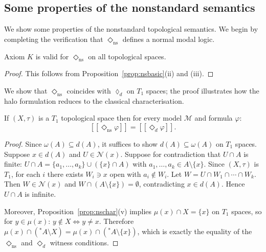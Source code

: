 \documentclass[submission,copyright,creativecommons]{eptcs}
\newcommand{\sem}[1]{[\![#1]\!]}
\newcommand{\diam}{\Diamond}
\newcommand{\sq}{\Box}
\newcommand{\str}{{{}^{*}\!}}
\newcommand{\lozengens}{\diam_\mathrm{ns}}
\begin{document}
\subsection{Some properties of the nonstandard semantics}
We show some properties of the nonstandard topological semantics.
We begin by completing the verification that $\lozengens$ defines a normal modal logic.
\begin{lemma}
\label{lem:nsK}
Axiom $K$ is valid for $\lozengens$ on all topological spaces.
\end{lemma}
\begin{proof}
This follows from Proposition~\ref{prop:nsbasic}(ii) and (iii).
\end{proof}

We show that $\lozengens$ coincides with $\lozenge_d$ on $T_1$ spaces; 
the proof illustrates how the halo formulation reduces to the classical characterisation.
\begin{lemma}
\label{thm:coincide}
If $(X,\tau)$ is a $T_1$ topological space then for every model $\mathcal{M}$
and formula $\varphi$:
\[
  \sem{\lozengens\varphi} = \sem{\diam_d\varphi}.
\]
\end{lemma}

\begin{proof}
Since $\omega(A) \subseteq d(A)$, it
suffices to show $d(A) \subseteq \omega(A)$ on
$T_1$ spaces.
Suppose $x \in d(A)$ and $U \in \mathcal{N}(x)$. Suppose for
contradiction that $U \cap A$ is finite: $U \cap A = \{a_1, \ldots, a_k\}
\cup (\{x\} \cap A)$ with $a_1, \ldots, a_k \in A \setminus \{x\}$.
Since $(X,\tau)$ is $T_1$, for each $i$ there exists $W_i \ni x$ open with
$a_i \notin W_i$. Let $W = U \cap W_1 \cap \cdots \cap W_k$. Then
$W \in \mathcal{N}(x)$ and $W \cap (A \setminus \{x\}) = \emptyset$,
contradicting $x \in d(A)$. Hence $U \cap A$ is infinite.

Moreover, Proposition~\ref{prop:nschar}(v) implies $\mu(x) \cap X = \{x\}$
on $T_1$ spaces, so for $y \in \mu(x)$: $y \notin X \iff y \neq x$.
Therefore $\mu(x) \cap (\str A \setminus X) = \mu(x) \cap
(\str A \setminus \{x\})$, which is exactly the equality of the
$\lozengens$ and $\diam_d$ witness conditions.
\end{proof}
\end{document}
